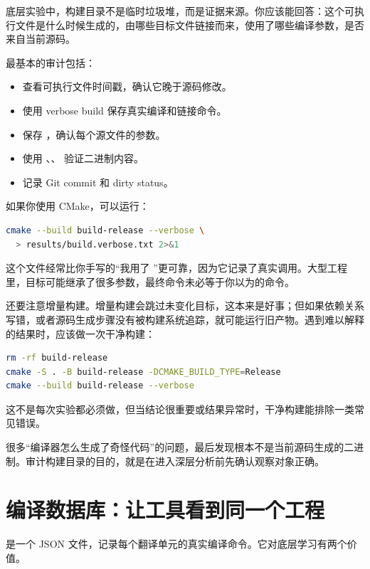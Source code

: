 底层实验中，构建目录不是临时垃圾堆，而是证据来源。你应该能回答：这个可执行文件是什么时候生成的，由哪些目标文件链接而来，使用了哪些编译参数，是否来自当前源码。

最基本的审计包括：

\begin{itemize}
  \item 查看可执行文件时间戳，确认它晚于源码修改。
  \item 使用 verbose build 保存真实编译和链接命令。
  \item 保存 ，确认每个源文件的参数。
  \item 使用 、、 验证二进制内容。
  \item 记录 Git commit 和 dirty status。
\end{itemize}

如果你使用 CMake，可以运行：

\begin{lstlisting}[language=bash]
cmake --build build-release --verbose \
  > results/build.verbose.txt 2>&1
\end{lstlisting}

这个文件经常比你手写的“我用了 ”更可靠，因为它记录了真实调用。大型工程里，目标可能继承了很多参数，最终命令未必等于你以为的命令。

还要注意增量构建。增量构建会跳过未变化目标，这本来是好事；但如果依赖关系写错，或者源码生成步骤没有被构建系统追踪，就可能运行旧产物。遇到难以解释的结果时，应该做一次干净构建：

\begin{lstlisting}[language=bash]
rm -rf build-release
cmake -S . -B build-release -DCMAKE_BUILD_TYPE=Release
cmake --build build-release --verbose
\end{lstlisting}

这不是每次实验都必须做，但当结论很重要或结果异常时，干净构建能排除一类常见错误。

\begin{deepdive}
很多“编译器怎么生成了奇怪代码”的问题，最后发现根本不是当前源码生成的二进制。审计构建目录的目的，就是在进入深层分析前先确认观察对象正确。
\end{deepdive}

\section{编译数据库：让工具看到同一个工程}

 是一个 JSON 文件，记录每个翻译单元的真实编译命令。它对底层学习有两个价值。

